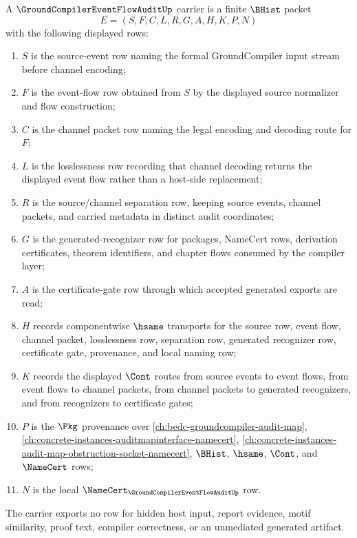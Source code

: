 \begin{definition}
\label{def:groundcompiler-eventflow-audit-carrier}
A $\GroundCompilerEventFlowAuditUp$ carrier is a finite $\BHist$ packet
$$
E=(S,F,C,L,R,G,A,H,K,P,N)
$$
with the following displayed rows:
\begin{enumerate}
\item $S$ is the source-event row naming the formal GroundCompiler input stream before channel encoding;
\item $F$ is the event-flow row obtained from $S$ by the displayed source normalizer and flow construction;
\item $C$ is the channel packet row naming the legal encoding and decoding route for $F$;
\item $L$ is the losslessness row recording that channel decoding returns the displayed event flow rather than a host-side replacement;
\item $R$ is the source/channel separation row, keeping source events, channel packets, and carried metadata in distinct audit coordinates;
\item $G$ is the generated-recognizer row for packages, NameCert rows, derivation certificates, theorem identifiers, and chapter flows consumed by the compiler layer;
\item $A$ is the certificate-gate row through which accepted generated exports are read;
\item $H$ records componentwise $\hsame$ transports for the source row, event flow, channel packet, losslessness row, separation row, generated recognizer row, certificate gate, provenance, and local naming row;
\item $K$ records the displayed $\Cont$ routes from source events to event flows, from event flows to channel packets, from channel packets to generated recognizers, and from recognizers to certificate gates;
\item $P$ is the $\Pkg$ provenance over \autoref{ch:bedc-groundcompiler-audit-map}, \autoref{ch:concrete-instances-auditmapinterface-namecert}, \autoref{ch:concrete-instances-audit-map-obstruction-socket-namecert}, $\BHist$, $\hsame$, $\Cont$, and $\NameCert$ rows;
\item $N$ is the local $\NameCert_{\GroundCompilerEventFlowAuditUp}$ row.
\end{enumerate}
The carrier exports no row for hidden host input, report evidence, motif similarity, proof text, compiler correctness, or an unmediated generated artifact.
\end{definition}

